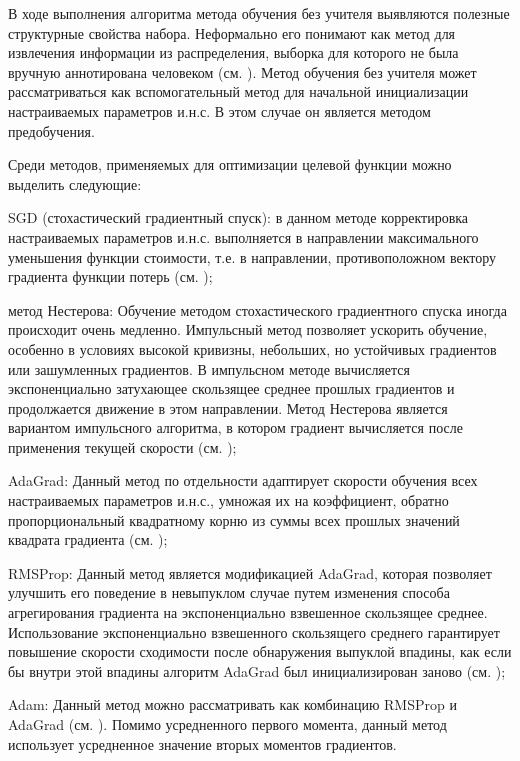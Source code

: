 В ходе выполнения алгоритма метода обучения без учителя выявляются полезные структурные свойства
набора. Неформально его понимают как метод для извлечения информации из распределения, выборка для которого
не была вручную аннотирована человеком (см. ). Метод обучения без учителя может рассматриваться как вспомогательный метод для начальной инициализации настраиваемых параметров и.н.с. В этом случае он является методом предобучения.

Среди методов, применяемых для оптимизации целевой функции можно выделить следующие:

\begin{textitemize}
	\item SGD (стохастический градиентный спуск): в данном методе корректировка настраиваемых параметров и.н.с. выполняется в направлении максимального уменьшения функции стоимости, т.е. в направлении, противоположном вектору градиента функции потерь (см. );
	\item метод Нестерова: Обучение методом стохастического градиентного спуска иногда происходит очень медленно. Импульсный метод позволяет ускорить обучение, особенно в условиях высокой кривизны, небольших, но устойчивых градиентов или зашумленных градиентов. В импульсном методе вычисляется экспоненциально затухающее скользящее среднее прошлых градиентов и продолжается движение в этом направлении. Метод Нестерова является вариантом импульсного алгоритма, в котором градиент вычисляется после применения текущей скорости (см. );
	\item AdaGrad: Данный метод по отдельности адаптирует скорости обучения всех настраиваемых параметров и.н.с., умножая их на коэффициент, обратно пропорциональный квадратному корню из суммы всех прошлых значений квадрата градиента (см. );
	\item RMSProp: Данный метод является модификацией AdaGrad, которая позволяет улучшить его поведение в невыпуклом случае путем изменения способа агрегирования градиента на экспоненциально взвешенное скользящее среднее. Использование экспоненциально взвешенного скользящего среднего гарантирует повышение скорости сходимости после обнаружения выпуклой впадины, как если бы внутри этой впадины алгоритм AdaGrad был инициализирован заново (см. );
	\item Adam: Данный метод можно рассматривать как комбинацию RMSProp и AdaGrad (см. ). Помимо усредненного первого момента, данный метод использует усредненное значение вторых моментов градиентов.
\end{textitemize}

